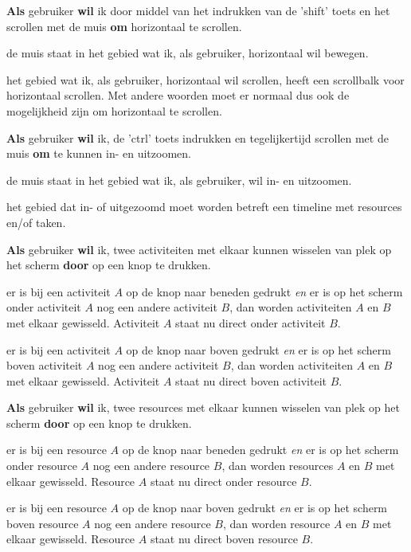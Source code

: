 \nextUserStory
\textbf{Als} gebruiker \textbf{wil} ik door middel van het indrukken van de 'shift' toets en het scrollen met de muis \textbf{om} horizontaal te scrollen. 
\beginGegeven
    \item de muis staat in het gebied wat ik, als gebruiker, horizontaal wil bewegen.
    \item het gebied wat ik, als gebruiker, horizontaal wil scrollen, heeft een scrollbalk voor horizontaal scrollen. Met andere woorden moet er normaal dus ook de mogelijkheid zijn om horizontaal te scrollen.
\endGegeven

\nextUserStory
\textbf{Als} gebruiker \textbf{wil} ik, de 'ctrl' toets indrukken en tegelijkertijd scrollen met de muis \textbf{om} te kunnen in- en uitzoomen. 
\beginGegeven
    \item de muis staat in het gebied wat ik, als gebruiker, wil in- en uitzoomen. 
    \item het gebied dat in- of uitgezoomd moet worden betreft een timeline met resources en/of taken.
\endGegeven

\nextUserStory
\textbf{Als} gebruiker \textbf{wil} ik, twee activiteiten met elkaar kunnen wisselen van plek op het scherm \textbf{door} op een knop te drukken. 
\beginGegeven
    \item er is bij een activiteit $A$ op de knop naar beneden gedrukt \emph{en} er is op het scherm onder activiteit $A$ nog een andere activiteit $B$, dan worden activiteiten $A$ en $B$ met elkaar gewisseld. Activiteit $A$ staat nu direct onder activiteit $B$.
    \item er is bij een activiteit $A$ op de knop naar boven gedrukt \emph{en} er is op het scherm boven activiteit $A$ nog een andere activiteit $B$, dan worden activiteiten $A$ en $B$ met elkaar gewisseld. Activiteit $A$ staat nu direct boven activiteit $B$.
\endGegeven

\nextUserStory
\textbf{Als} gebruiker \textbf{wil} ik, twee resources met elkaar kunnen wisselen van plek op het scherm \textbf{door} op een knop te drukken.
\beginGegeven
    \item er is bij een resource $A$ op de knop naar beneden gedrukt \emph{en} er is op het scherm onder resource $A$ nog een andere resource $B$, dan worden resources $A$ en $B$ met elkaar gewisseld. Resource $A$ staat nu direct onder resource $B$.
    \item er is bij een resource $A$ op de knop naar boven gedrukt \emph{en} er is op het scherm boven resource $A$ nog een andere resource $B$, dan worden resource $A$ en $B$ met elkaar gewisseld. Resource $A$ staat nu direct boven resource $B$.
\endGegeven

